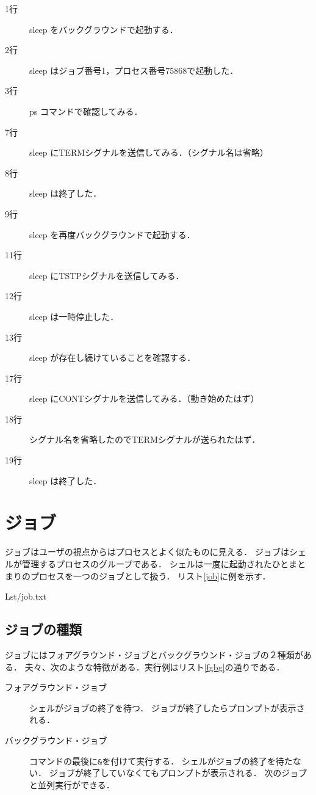 

\begin{description}
\item[1行] sleep をバックグラウンドで起動する．
\item[2行] sleep はジョブ番号1，プロセス番号75868で起動した．
\item[3行] ps コマンドで確認してみる．
\item[7行] sleep にTERMシグナルを送信してみる．（シグナル名は省略）
\item[8行] sleep は終了した．
\item[9行] sleep を再度バックグラウンドで起動する．
\item[11行] sleep にTSTPシグナルを送信してみる．
\item[12行] sleep は一時停止した．
\item[13行] sleep が存在し続けていることを確認する．
\item[17行] sleep にCONTシグナルを送信してみる．（動き始めたはず）
\item[18行] シグナル名を省略したのでTERMシグナルが送られたはず．
\item[19行] sleep は終了した．
\end{description}

\section{ジョブ}
ジョブはユーザの視点からはプロセスとよく似たものに見える．
ジョブはシェルが管理するプロセスのグループである．
シェルは一度に起動されたひとまとまりのプロセスを一つのジョブとして扱う．
リスト\ref{job}に例を示す．


                {Lst/job.txt}

\subsection{ジョブの種類}
ジョブにはフォアグラウンド・ジョブとバックグラウンド・ジョブの２種類がある．
夫々、次のような特徴がある．実行例はリスト\ref{fgbg}の通りである．

\begin{description}
\item[フォアグラウンド・ジョブ]
シェルがジョブの終了を待つ．
ジョブが終了したらプロンプトが表示される．

\item[バックグラウンド・ジョブ]
コマンドの最後に\texttt{\&}を付けて実行する．
シェルがジョブの終了を待たない．
ジョブが終了していなくてもプロンプトが表示される．
次のジョブと並列実行ができる．
\end{description}

